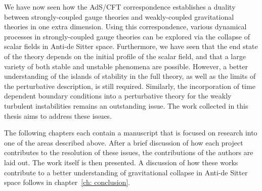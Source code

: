 \documentclass[../PhD.tex]{subfiles}
\begin{document}
We have now seen how the AdS/CFT correspondence establishes a duality between strongly-coupled gauge theories and weakly-coupled gravitational theories in one extra dimension. Using this correspondence, various dynamical processes in strongly-coupled gauge theories can be explored via the collapse of scalar fields in Anti-de Sitter space. Furthermore, we have seen that the end state of the theory depends on the initial profile of the scalar field, and that a large variety of both stable and unstable phenomena are possible. However, a better understanding of the islands of stability in the full theory, as well as the limits of the perturbative description, is still required. Similarly, the incorporation of time dependent boundary conditions into a perturbative theory for the weakly turbulent instabilities remains an outstanding issue. The work collected in this thesis aims to address these issues.

The following chapters each contain a manuscript that is focused on research into one of the areas described above. After a brief discussion of how each project contributes to the resolution of these issues, the contributions of the authors are laid out. The work itself is then presented. A discussion of how these works contribute to a better understanding of gravitational collapse in Anti-de Sitter space follows in chapter~\ref{ch: conclusion}.

\end{document}
